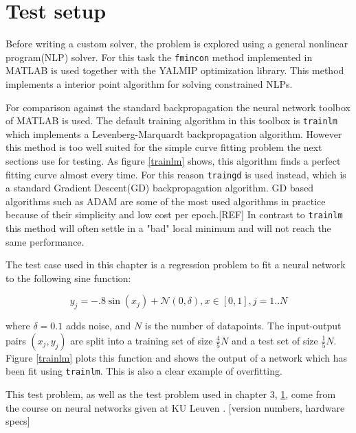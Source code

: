 \section{Test setup}
Before writing a custom solver, the problem is explored using a general nonlinear program(NLP) solver. For this task the \texttt{fmincon} method implemented in MATLAB is used together with the YALMIP optimization library. This method implements a interior point algorithm for solving constrained NLPs. 

For comparison against the standard backpropagation the neural network toolbox of MATLAB is used. The default training algorithm in this toolbox is \texttt{trainlm} which implements a Levenberg-Marquardt backpropagation algorithm. However this method is too well suited for the simple curve fitting problem the next sections use for testing. As figure \ref{trainlm} shows, this algorithm finds a perfect fitting curve almost every time. For this reason \texttt{traingd} is used instead, which is a standard Gradient Descent(GD) backpropagation algorithm. GD based algorithms such as ADAM are some of the most used algorithms in practice because of their simplicity and low cost per epoch.[REF] In contrast to \texttt{trainlm} this method will often settle in a "bad" local minimum and will not reach the same performance.

The test case used in this chapter is a regression problem to fit a neural network to the following sine function:

\begin{equation}
y_j = -.8\sin(x_j) + \mathcal N(0,\delta), x \in [0,1], j = 1..N
\label{sin}
\end{equation}

where $\delta=0.1$ adds noise, and $N$ is the number of datapoints. The input-output pairs $(x_j,y_j)$ are split into a training set of size $\frac{4}{5}N$ and a test set of size $\frac{1}{5}N$. Figure \ref{trainlm} plots this function and shows the output of a network which has been fit using \texttt{trainlm}. This is also a clear example of overfitting.

This test problem, as well as the test problem used in chapter 3, \ref{}, come from the course on neural networks given at KU Leuven \cite{}. [version numbers, hardware specs]

